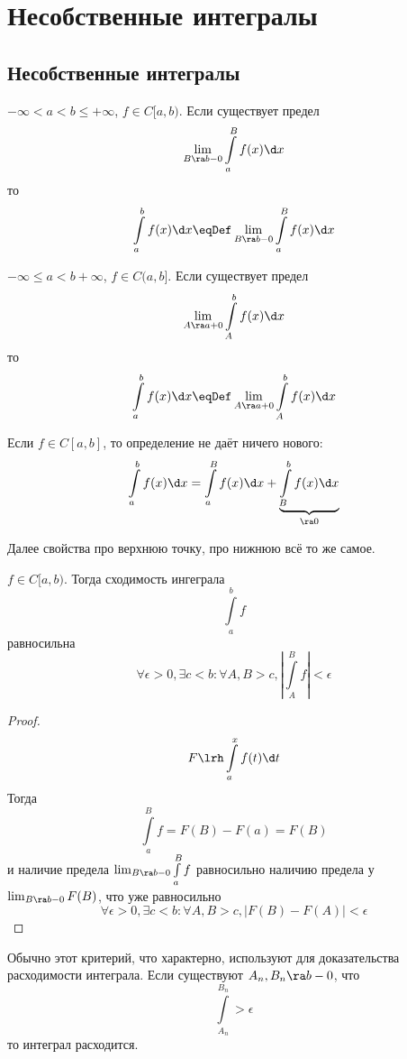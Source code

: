 \chapter{Несобственные интегралы}

\section{Несобственные интегралы}

\begin{Def}
	$-\infty < a < b \le +\infty$, $f \in C[a,b)$.
	Если существует предел
	\[ \lim_{B \ra b-0} \int\limits_a^B f(x) \d x \]
	то
	\[ \int\limits_a^b f(x) \d x \eqDef \lim_{B \ra b-0} \int\limits_a^B f(x) \d x \]
\end{Def}

\begin{Def}
	$-\infty \le a < b +\infty$, $f \in C(a,b]$.
	Если существует предел
	\[ \lim_{A \ra a+0} \int\limits_A^b f(x) \d x \]
	то
	\[ \int\limits_a^b f(x) \d x \eqDef \lim_{A \ra a+0} \int\limits_A^b f(x) \d x \]
\end{Def}

\begin{Rem}
	Если $f \in C[a, b]$, то определение не даёт ничего нового:
	\[ \int\limits_a^b f(x) \d x = \int\limits_a^B f(x) \d x + \underbrace{\int\limits_B^b f(x) \d x}_{\ra0} \]
\end{Rem}

Далее свойства про верхнюю точку, про нижнюю всё то же самое.

\begin{theorem}
	$f \in C[a, b)$. Тогда сходимость ингеграла
	\[ \int\limits_a^b f \]
	равносильна
	\[ \forall \epsilon > 0, \exists c < b\colon \forall A, B > c, \left|\int\limits_A^B f\right| < \epsilon \]
\end{theorem}
\begin{proof}
	\[ F \lrh \int\limits_a^x f(t) \d t \]
	Тогда
	\[ \int\limits_a^B f = F(B) - F(a) = F(B) \]
	и наличие предела $\lim_{B \ra b-0} \int\limits_a^B f$ равносильно наличию предела у $\lim_{B \ra b-0} F(B)$,
	что уже равносильно
	\[ \forall \epsilon > 0, \exists c < b\colon \forall A, B > c, |F(B) - F(A)| < \epsilon \]
\end{proof}

\begin{Rem}
	Обычно этот критерий, что характерно, используют для доказательства расходимости интеграла.
	Если существуют $A_n, B_n \ra b-0$, что
	\[ \int\limits_{A_n}^{B_n} > \epsilon \]
	то интеграл расходится.
\end{Rem}

